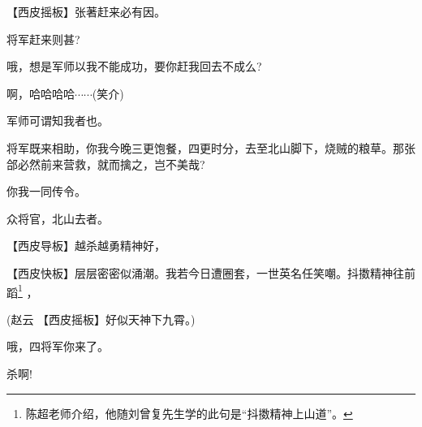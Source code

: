 {【{\akai 西皮摇板}】张著赶来必有因。

将军赶来则甚?

哦，想是军师以我不能成功，要你赶我回去不成么?

啊，哈哈哈哈$\cdots${}$\cdots${}({\hwfs 笑介})

军师可谓知我者也。

将军既来相助，你我今晚三更饱餐，四更时分，去至北山脚下，烧贼的粮草。那张郃必然前来营救，就而擒之，岂不美哉?

你我一同传令。

众将官，北山去者。

\vspace{5pt}

【{\akai 西皮导板}】越杀越勇精神好，

【{\akai 西皮快板}】层层密密似涌潮。我若今日遭圈套，一世英名任笑嘲。抖擞精神往前蹈\footnote{陈超老师介绍，他随刘曾复先生学的此句是``抖擞精神上山道''。}%
，

(赵云\hspace{25pt} 【{\akai 西皮摇板}】好似天神下九霄。)

哦，四将军你来了。

杀啊!
}
